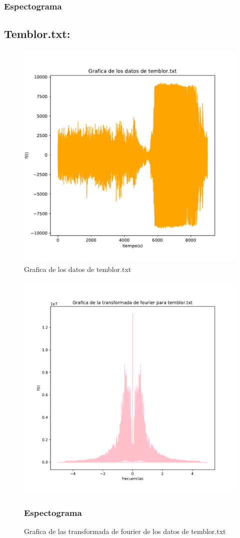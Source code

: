 \documentclass[11pt,letterpaper]{exam}
\begin{document}
\subsubsection{Espectograma}
\subsection{Temblor.txt:}
\begin{figure}[H]
    \centering
    \includegraphics[width=1.1\textwidth]{Temblor.pdf}
    \caption{Grafica de los datos de temblor.txt}
    \label{fig:my_label}
\end{figure}
\begin{figure}[H]
    \centering
    \includegraphics[width=1.1\textwidth]{Fourier_temblor.pdf}
    \caption{Grafica de las transformada de fourier de los datos de temblor.txt}
    \label{fig:my_label}
\subsubsection{Espectograma}
\end{figure}
\end{document}

